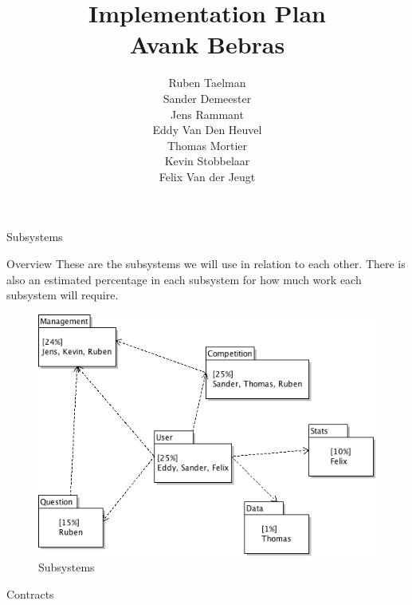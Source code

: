 \documentclass[10pt,a4paper]{article}
\author{
    Ruben Taelman \\
    Sander Demeester \\
    Jens Rammant \\
    Eddy Van Den Heuvel \\
    Thomas Mortier \\
    Kevin Stobbelaar \\
    Felix Van der Jeugt
}
\title{
    Implementation Plan \\
    Avank Bebras
}
\begin{document}
\begin{section}{Subsystems}
	\begin{subsection}{Overview}
		These are the subsystems we will use in relation to each other. There is also an
		estimated percentage in each subsystem for how much work each subsystem will
		require.
		\begin{figure}[!h]
		  \centering
			\includegraphics[width=1\textwidth]{../class_diagrams/subsystems.png}
		  \caption{Subsystems}
		  \label{subsystems}
		\end{figure}
	\end{subsection}
	
	\begin{subsection}{Contracts}
		
		
		
        
		
	\end{subsection}
	
	
	
	
	
	
	
	
\end{section}	
\end{document}
